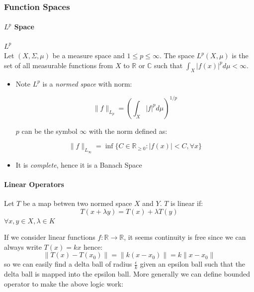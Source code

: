 \subsubsection{Function Spaces}

\paragraph{$L^p$ Space}

\begin{definition}[ space]\textbf{$L^p$}\\
Let $(X,\Sigma, \mu)$ be a measure space and $1\leq p\leq \infty$. The space $L^p(X,\mu)$ is the set of all measurable functions from $X$ to $\mathbb{R}$ or $\mathbb{C}$ such that $\int_X |f(x)|^p d\mu < \infty$.

\begin{itemize}
\item Note $L^p$ is a \textit{normed space} with norm:

\begin{equation}
\|f\|_{L_p}=\left(\int_X |f|^p d\mu\right)^{1/p}
\end{equation}


$p$ can be the symbol $\infty$ with the norm defined as:

\begin{equation}
\|f\|_{L_{\infty}} = \inf\{C\in \mathbb{R}_{\geq 0} : |f(x)|<C, \forall x\}
\end{equation}


\item It is \textit{complete}, hence it is a Banach Space
\end{itemize}

\end{definition}\paragraph{Linear Operators}

\begin{definition}Let $T$ be a map betwen two normed space $X$ and $Y$. $T$ is linear if:
\begin{equation}
T(x+\lambda y) = T(x) +\lambda T(y)
\end{equation}
$\forall x,y \in X, \lambda \in K$

\end{definition}If we consider linear functions $f:\mathbb{R}\to \mathbb{R}$, it seems continuity is free since we can always write $T(x)=kx$ hence:
\begin{equation}
\|T(x)-T(x_0)\|=\|k(x-x_0)\|=k\|x-x_0\|
\end{equation}
so we can easily find a delta ball of radius $\frac{\epsilon}{k}$ given an epsilon ball such that the delta ball is mapped into the epsilon ball. More generally we can define bounded operator to make the above logic work:


